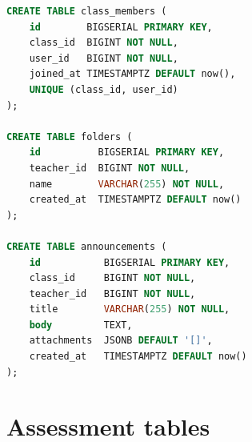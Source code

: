 \begin{lstlisting}[language=SQL,basicstyle=\ttfamily\footnotesize,breaklines=true]
CREATE TABLE class_members (
    id        BIGSERIAL PRIMARY KEY,
    class_id  BIGINT NOT NULL,
    user_id   BIGINT NOT NULL,
    joined_at TIMESTAMPTZ DEFAULT now(),
    UNIQUE (class_id, user_id)
);

CREATE TABLE folders (
    id          BIGSERIAL PRIMARY KEY,
    teacher_id  BIGINT NOT NULL,
    name        VARCHAR(255) NOT NULL,
    created_at  TIMESTAMPTZ DEFAULT now()
);

CREATE TABLE announcements (
    id           BIGSERIAL PRIMARY KEY,
    class_id     BIGINT NOT NULL,
    teacher_id   BIGINT NOT NULL,
    title        VARCHAR(255) NOT NULL,
    body         TEXT,
    attachments  JSONB DEFAULT '[]',
    created_at   TIMESTAMPTZ DEFAULT now()
);
\end{lstlisting}

\section{Assessment tables}

